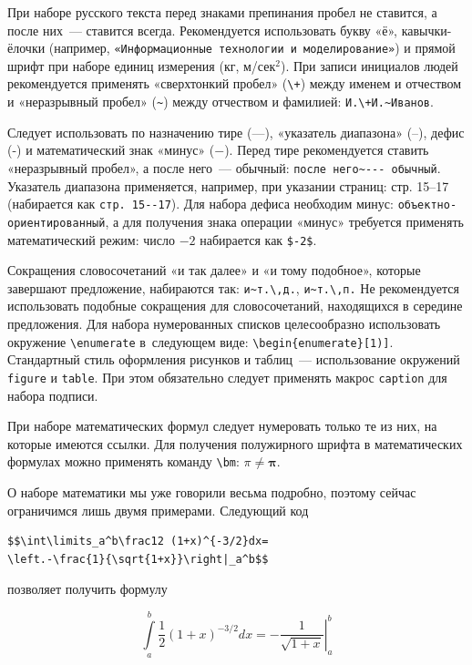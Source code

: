 При наборе русского текста перед знаками препинания пробел не ставится, 
а после них~--- ставится всегда. Рекомендуется использовать букву «ё», 
кавычки-ёлочки 
(например, \verb|«Информационные технологии и моделирование»|) и
прямой шрифт при наборе единиц измерения (кг, м/сек${}^2$).
При записи инициалов людей рекомендуется применять «сверхтонкий пробел» 
(\verb|\+|) между именем и отчеством и «неразрывный пробел» (\verb|~|) между
отчеством и фамилией: \verb|И.\+И.~Иванов|. 

Следует использовать по назначению тире
(---), «указатель диапазона» (--), дефис (-) и математический знак «минус»
($-$). Перед тире рекомендуется ставить «неразрывный
пробел», а после него~--- обычный: \verb|после него~--- обычный|. Указатель
диапазона применяется, например, при указании страниц: стр. 15--17
(набирается как \verb|стр. 15--17|). Для набора дефиса необходим минус: 
\verb|объектно-ориентированный|, а для получения знака операции  «минус»
требуется применять математический режим: число $-2$ набирается как
\verb|$-2$|. 

Сокращения словосочетаний «и так далее» и «и тому подобное», которые
завершают предложение, набираются так: \verb|и~т.\,д.|, \verb|и~т.\,п.|
Не рекомендуется использовать подобные сокращения для словосочетаний,
находящихся в середине предложения. Для набора нумерованных списков 
целесообразно использовать окружение \verb|\enumerate| в~следующем виде:
\verb|\begin{enumerate}[1)]|.
Стандартный стиль оформления рисунков и таблиц~--- использование окружений
\verb|figure| и \verb|table|. При этом обязательно следует применять макрос
\verb|caption| для набора подписи. 

При наборе математических формул следует нумеровать только те из них, на
которые имеются ссылки. Для получения полужирного шрифта в математических
формулах можно применять команду \verb|\bm|: $\pi \ne \bm\pi$.

О наборе математики мы уже говорили весьма подробно, поэтому сейчас 
ограничимся лишь двумя примерами. Следующий код
\begin{small}
\begin{verbatim}
$$\int\limits_a^b\frac12 (1+x)^{-3/2}dx=
\left.-\frac{1}{\sqrt{1+x}}\right|_a^b$$
\end{verbatim}
\end{small}
\noindent позволяет получить формулу

$$\int\limits_a^b\frac12 (1+x)^{-3/2}dx=
\left.-\frac{1}{\sqrt{1+x}}\right|_a^b$$


